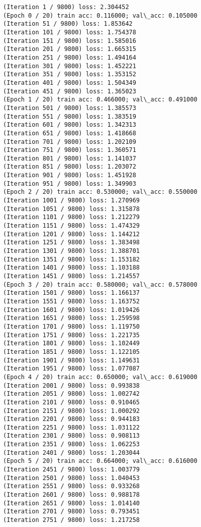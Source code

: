 \documentclass[11pt]{article}
\begin{document}
    \begin{Verbatim}[commandchars=\\\{\}]
(Iteration 1 / 9800) loss: 2.304452
(Epoch 0 / 20) train acc: 0.116000; val\_acc: 0.105000
(Iteration 51 / 9800) loss: 1.853642
(Iteration 101 / 9800) loss: 1.754378
(Iteration 151 / 9800) loss: 1.585016
(Iteration 201 / 9800) loss: 1.665315
(Iteration 251 / 9800) loss: 1.494164
(Iteration 301 / 9800) loss: 1.452221
(Iteration 351 / 9800) loss: 1.353152
(Iteration 401 / 9800) loss: 1.504349
(Iteration 451 / 9800) loss: 1.365023
(Epoch 1 / 20) train acc: 0.466000; val\_acc: 0.491000
(Iteration 501 / 9800) loss: 1.385573
(Iteration 551 / 9800) loss: 1.383519
(Iteration 601 / 9800) loss: 1.342313
(Iteration 651 / 9800) loss: 1.418668
(Iteration 701 / 9800) loss: 1.202109
(Iteration 751 / 9800) loss: 1.360571
(Iteration 801 / 9800) loss: 1.141037
(Iteration 851 / 9800) loss: 1.203072
(Iteration 901 / 9800) loss: 1.451928
(Iteration 951 / 9800) loss: 1.349903
(Epoch 2 / 20) train acc: 0.530000; val\_acc: 0.550000
(Iteration 1001 / 9800) loss: 1.270969
(Iteration 1051 / 9800) loss: 1.315878
(Iteration 1101 / 9800) loss: 1.212279
(Iteration 1151 / 9800) loss: 1.474329
(Iteration 1201 / 9800) loss: 1.144212
(Iteration 1251 / 9800) loss: 1.383498
(Iteration 1301 / 9800) loss: 1.388701
(Iteration 1351 / 9800) loss: 1.153182
(Iteration 1401 / 9800) loss: 1.103188
(Iteration 1451 / 9800) loss: 1.214557
(Epoch 3 / 20) train acc: 0.580000; val\_acc: 0.578000
(Iteration 1501 / 9800) loss: 1.166137
(Iteration 1551 / 9800) loss: 1.163752
(Iteration 1601 / 9800) loss: 1.019426
(Iteration 1651 / 9800) loss: 1.259598
(Iteration 1701 / 9800) loss: 1.119750
(Iteration 1751 / 9800) loss: 1.221735
(Iteration 1801 / 9800) loss: 1.102449
(Iteration 1851 / 9800) loss: 1.122105
(Iteration 1901 / 9800) loss: 1.149631
(Iteration 1951 / 9800) loss: 1.077087
(Epoch 4 / 20) train acc: 0.650000; val\_acc: 0.619000
(Iteration 2001 / 9800) loss: 0.993838
(Iteration 2051 / 9800) loss: 1.002742
(Iteration 2101 / 9800) loss: 0.910465
(Iteration 2151 / 9800) loss: 1.000292
(Iteration 2201 / 9800) loss: 0.944183
(Iteration 2251 / 9800) loss: 1.031122
(Iteration 2301 / 9800) loss: 0.908113
(Iteration 2351 / 9800) loss: 1.062253
(Iteration 2401 / 9800) loss: 1.203044
(Epoch 5 / 20) train acc: 0.664000; val\_acc: 0.616000
(Iteration 2451 / 9800) loss: 1.003779
(Iteration 2501 / 9800) loss: 1.040453
(Iteration 2551 / 9800) loss: 0.933268
(Iteration 2601 / 9800) loss: 0.988178
(Iteration 2651 / 9800) loss: 1.014140
(Iteration 2701 / 9800) loss: 0.793451
(Iteration 2751 / 9800) loss: 1.217258

\end{Verbatim}
\end{document}
